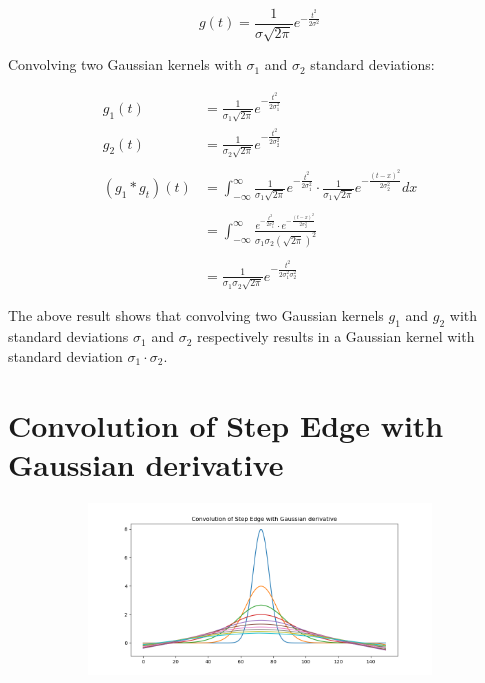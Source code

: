 \documentclass[12pt, oneside]{article}
\begin{document}
$$ g(t) = \frac{1}{\sigma \sqrt{2 \pi}}e^{-\frac{t^2}{2 \sigma ^ 2}} $$

Convolving two Gaussian kernels with $\sigma_1$ and $\sigma_2$ standard
deviations:

\begin{align*}
    g_1(t) &= \frac{1}{\sigma_1 \sqrt{2 \pi}}e^{-\frac{t^2}{2 \sigma_1 ^ 2}}  \\
    g_2(t) &= \frac{1}{\sigma_2 \sqrt{2 \pi}}e^{-\frac{t^2}{2 \sigma_2 ^ 2}}  \\\\
    (g_1 * g_t)(t) &= 
    \int_{-\infty}^{\infty} 
    \frac{1}{\sigma_1 \sqrt{2 \pi}}e^{-\frac{t^2}{2 \sigma_1 ^ 2}} 
    \cdot
    \frac{1}{\sigma_1 \sqrt{2 \pi}}e^{-\frac{(t-x)^2}{2 \sigma_2 ^ 2}} dx  \\\\
    &= \int_{-\infty}^{\infty} 
    \frac{  e^{-\frac{t^2}{2 \sigma_1 ^ 2}} \cdot 
            e^{-\frac{(t-x)^2}{2 \sigma_2 ^ 2}}}{ 
                \sigma_1 \sigma_2 (\sqrt{2 \pi})^2}    \\\\
    &= \frac{1}{\sigma_1 \sigma_2 \sqrt{2 \pi}}
    e^{-\frac{t^2}{2 \sigma_1 ^ 2 \sigma_2 ^ 2 }} 
\end{align*}

The above result shows that convolving two Gaussian kernels $g_1$ and $g_2$
with standard deviations $\sigma_1$ and $\sigma_2$ respectively results in
a Gaussian kernel with standard deviation $\sigma_1 \cdot \sigma_2$.

\section{Convolution of Step Edge with Gaussian derivative}


\begin{figure}[H]
    \centering
    \begin{subfigure}[b]{1\textwidth}
        \centering
        \includegraphics[width=\textwidth]{imgs/q3_plot.png}
    \end{subfigure}
    \caption{}
\end{figure}
\end{document}
